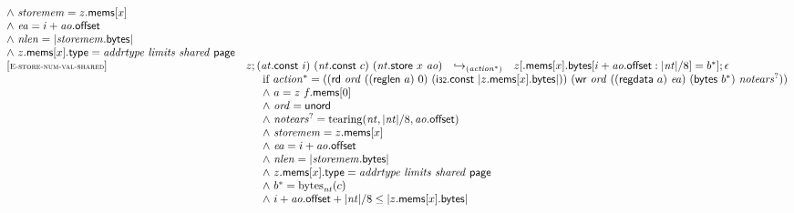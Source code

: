 $$\begin{array}[t]{@{}lrcl@{}l@{}}
{\begin{array}[t]{@{}l@{}}
{\land}~ {\mathit{storemem}} = z{.}\mathsf{mems}{}[x] \\
{\land}~ {\mathit{ea}} = i + {\mathit{ao}}{.}\mathsf{offset} \\
{\land}~ {\mathit{nlen}} = {|{\mathit{storemem}}{.}\mathsf{bytes}|} \\
{\land}~ z{.}\mathsf{mems}{}[x]{.}\mathsf{type} = {\mathit{addrtype}}~{\mathit{limits}}~{\mathit{shared}}~\mathsf{page} \\
\end{array}
} \\
{[\textsc{\scriptsize E{-}store{-}num{-}val{-}shared}]} \quad & z ; ({\mathit{at}}{.}\mathsf{const}~i)~({\mathit{nt}}{.}\mathsf{const}~c)~({\mathit{nt}}{.}\mathsf{store}~x~{\mathit{ao}}) & {\hookrightarrow}_{({{\mathit{action}}^\ast})} {} & z{}[{.}\mathsf{mems}{}[x]{.}\mathsf{bytes}{}[i + {\mathit{ao}}{.}\mathsf{offset} : {|{\mathit{nt}}|} / 8] = {b^\ast}] ; \epsilon &  \\
& \multicolumn{4}{@{}l@{}}{\quad
\quad
\begin{array}[t]{@{}l@{}}
\mbox{if}~ {{\mathit{action}}^\ast} = ((\mathsf{rd}~{\mathit{ord}}~((\mathsf{reglen}~a)~0)~(\mathsf{i{\scriptstyle 32}}{.}\mathsf{const}~{|z{.}\mathsf{mems}{}[x]{.}\mathsf{bytes}|}))~(\mathsf{wr}~{\mathit{ord}}~((\mathsf{regdata}~a)~{\mathit{ea}})~(\mathsf{bytes}~{b^\ast})~{{\mathit{notears}}^?})) \\
{\land}~ a = z~f{.}\mathsf{mems}{}[0] \\
{\land}~ {\mathit{ord}} = \mathsf{unord} \\
{\land}~ {{\mathit{notears}}^?} = {\mathrm{tearing}}({\mathit{nt}}, {|{\mathit{nt}}|} / 8, {\mathit{ao}}{.}\mathsf{offset}) \\
{\land}~ {\mathit{storemem}} = z{.}\mathsf{mems}{}[x] \\
{\land}~ {\mathit{ea}} = i + {\mathit{ao}}{.}\mathsf{offset} \\
{\land}~ {\mathit{nlen}} = {|{\mathit{storemem}}{.}\mathsf{bytes}|} \\
{\land}~ z{.}\mathsf{mems}{}[x]{.}\mathsf{type} = {\mathit{addrtype}}~{\mathit{limits}}~{\mathit{shared}}~\mathsf{page} \\
{\land}~ {b^\ast} = {{\mathrm{bytes}}}_{{\mathit{nt}}}(c) \\
{\land}~ i + {\mathit{ao}}{.}\mathsf{offset} + {|{\mathit{nt}}|} / 8 \leq {|z{.}\mathsf{mems}{}[x]{.}\mathsf{bytes}|} \\
\end{array}
} \\

\end{array}$$

